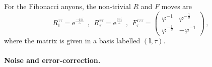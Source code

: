 \documentclass[aps, prl, letterpaper, twocolumn, superscriptaddress, notitlepage, 10pt]{revtex4-1}
\newcommand{\e}{\mathrm{e}}
\newcommand{\vac}{\mathbb{I}}
\begin{document}

For the Fibonacci anyons, the non-trivial $R$ and $F$ moves are 
\begin{equation*}
	R_{\vac}^{\tau\tau} = \e^{\frac{-4\pi i}{5}} 
	\ \ , \ \
	R_\tau^{\tau\tau}= \e^{\frac{3\pi i}{5}} 
	\ \ , \ \
	F_{\tau}^{\tau\tau\tau} = \begin{pmatrix}\varphi^{-1}&\varphi^{-\frac{1}{2}}\\\varphi^{-\frac{1}{2}}&-\varphi^{-1}\end{pmatrix} \,,
\end{equation*}
where the matrix is given in a basis labelled $(\vac,\tau)$.


\paragraph{Noise and error-correction.}
\end{document}

